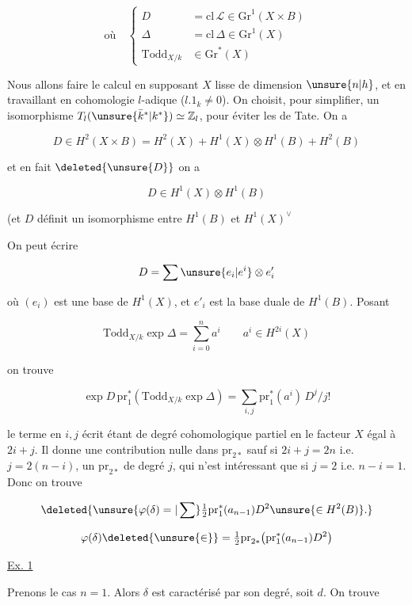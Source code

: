 \[
\text{où}\quad\left\{\begin{aligned}
D&=\mathrm{cl}\,\mathcal L\in\mathrm{Gr}^1(X\times B)\\
\Delta&=\mathrm{cl}\,\Delta\in\mathrm{Gr}^1(X)\\
\mathrm{Todd}_{X/k}&\in\mathrm{Gr}^*(X)
\end{aligned}\right.
\]

Nous allons faire le calcul en supposant $X$ lisse de dimension $\unsure{n|h}$, et en travaillant en cohomologie $l$-adique ($l.1_k\ne0$). On choisit, pour simplifier, un isomorphisme $T_l(\unsure{\bar k^*|k^*})\simeq\mathbb Z_l$, pour éviter les  de Tate. On a

\[
D\in H^2(X\times B)=H^2(X)+H^1(X)\otimes H^1(B)+H^2(B)
\]

et en fait $\deleted{\unsure{D}}$ on a

\[
D\in H^1(X)\otimes H^1(B)
\]

(et $D$ définit un isomorphisme entre $H^1(B)$ et $H^1(X)^\vee$\unsure{)|,|),}

On peut écrire

\[
D=\sum \unsure{e_i|e^i}\otimes e'_i
\]

où $(e_i)$ est une base de $H^1(X)$, et $e'_i$ est la base duale de $H^1(B)$. Posant

\[
\mathrm{Todd}_{X/k}\exp\Delta=\sum_{i=0}^{n}a^i\qquad a^i\in H^{2i}(X)
\]

on trouve

\[
\exp D\,\mathrm{pr}_1^*(\mathrm{Todd}_{X/k}\exp\Delta)=\sum_{i,j}\mathrm{pr}_1^*(a^i)\,D^j/j!
\]

le terme en $i,j$ écrit étant de degré cohomologique partiel en le facteur $X$ égal à $2i+j$. Il donne une contribution nulle dans $\mathrm{pr}_{2*}$ sauf si $2i+j=2n$ i.e. $j=2(n-i)$,   un $\mathrm{pr}_{2*}$ de degré $j$, qui n'est intéressant que si $j=2$ i.e. $n-i=1$.  Donc on trouve

\[
\deleted{\unsure{\varphi(\delta)=|\sum}\tfrac12\mathrm{pr}_1^*(a_{n-1})D^2\unsure{\in H^2(B)}.}
\]

\[
\varphi(\delta)\deleted{\unsure{\in}}=\tfrac12\mathrm{pr}_{2*}\bigl(\mathrm{pr}_1^*(a_{n-1})D^2\bigr)
\]

\uline{Ex. 1}

Prenons le cas $n=1$. Alors $\delta$ est caractérisé par son degré, soit \deleted{\unsure{$\delta$}} $d$. On trouve

